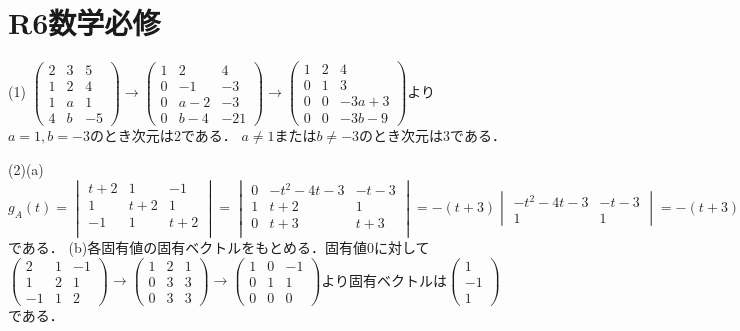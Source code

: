 \documentclass[
		book,
		head_space=20mm,
		foot_space=20mm,
		gutter=10mm,
		line_length=190mm
]{jlreq}
\begin{document}
\section{R6数学必修}
(1) $\begin{pmatrix}
    2 & 3 & 5\\
    1 & 2 & 4\\
    1 & a & 1 \\
    4 & b & -5
\end{pmatrix}\rightarrow \begin{pmatrix}
    1 & 2 & 4\\
    0 & -1 & -3\\
    0 & a-2 & -3\\
    0 & b-4 & -21
\end{pmatrix}\rightarrow \begin{pmatrix}
    1 & 2 & 4\\
    0 & 1 & 3\\
    0 & 0 & -3a+3\\
    0 & 0 & -3b-9 
    \end{pmatrix}$より$a=1,b=-3$のとき次元は$2$である．
    $a \neq 1 $または$b \neq -3$のとき次元は$3$である．

(2)(a)$g_A(t)=\begin{vmatrix}
    t+2 & 1 & -1 \\
    1 & t+2 & 1 \\
    -1 & 1 & t+2\\
    \end{vmatrix}=\begin{vmatrix}
    0 & -t^2-4t-3& -t-3\\
    1 & t+2 & 1 \\
    0 & t+3 & t+3\\
    \end{vmatrix}=-(t+3)\begin{vmatrix}
        -t^2-4t -3& -t-3\\
        1 & 1
    \end{vmatrix}=-(t+3)(-t^2-4t-3+t+3)=t(t+3)^2$である．
(b)各固有値の固有ベクトルをもとめる．固有値$0$に対して$\begin{pmatrix}
    2 & 1 & -1\\
    1 & 2 & 1\\
    -1 & 1 & 2
\end{pmatrix}\rightarrow \begin{pmatrix}
    1 & 2 & 1\\
    0 & 3 & 3\\
    0 & 3 & 3
\end{pmatrix}\rightarrow \begin{pmatrix}
    1 & 0 & -1\\
    0 & 1 & 1\\
    0 & 0 & 0
\end{pmatrix}$より固有ベクトルは$\begin{pmatrix}
    1\\
    -1\\
    1
\end{pmatrix}$である．
\end{document}
